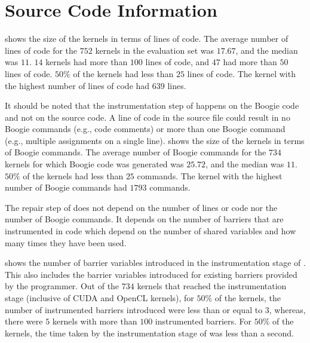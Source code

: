 \section{Source Code Information}

 shows the size of the kernels in terms of lines of code. The average number of lines of code for the $752$ kernels in the evaluation set was $17.67$, and the median was $11$. $14$ kernels had more than $100$ lines of code, and $47$ had more than $50$ lines of code. $50\%$ of the kernels had less than $25$ lines of code. The kernel with the highest number of lines of code had $639$ lines.



It should be noted that the instrumentation step of \tool happens on the Boogie code and not on the source code. A line of code in the source file could result in no Boogie commands (e.g., code comments) or more than one Boogie command (e.g., multiple assignments on a single line).  shows the size of the kernels in terms of Boogie commands. The average number of Boogie commands for the $734$ kernels for which Boogie code was generated was $25.72$, and the median was $11$. $50\%$ of the kernels had less than $25$ commands. The kernel with the highest number of Boogie commands had $1793$ commands.



The repair step of \tool does not depend on the number of lines or code nor the number of Boogie commands. It depends on the number of barriers that are instrumented in code which depend on the number of shared variables and how many times they have been used.

 shows the number of barrier variables introduced in the instrumentation stage of \tool. This also includes the barrier variables introduced for existing barriers provided by the programmer. Out of the $734$ kernels that reached the instrumentation stage (inclusive of CUDA and OpenCL kernels), for $50\%$ of the kernels, the number of instrumented barriers introduced were less than or equal to $3$, whereas, there were $5$ kernels with more than $100$ instrumented barriers. For $50\%$ of the kernels, the time taken by the instrumentation stage of \tool was less than a second.
